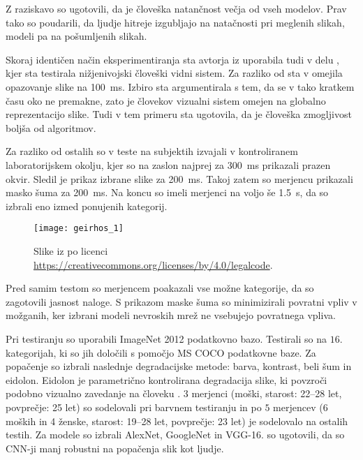 Z raziskavo so ugotovili, da je človeška natančnost večja od vseh modelov. Prav tako so poudarili, da ljudje hitreje izgubljajo na natačnosti pri meglenih slikah, modeli pa na pošumljenih slikah.

Skoraj identičen način eksperimentiranja sta avtorja iz \cite{dodge2017a} uporabila tudi v delu \cite{dodge2017can}, kjer sta testirala nižjenivojski človeški vidni sistem. Za razliko od \cite{dodge2017a} sta v \cite{dodge2017can} omejila opazovanje slike na \SI{100}{\ms}. Izbiro sta argumentirala s tem, da se v tako kratkem času oko ne premakne, zato je človekov vizualni sistem omejen na globalno reprezentacijo slike. Tudi v tem primeru sta ugotovila, da je človeška zmogljivost boljša od algoritmov.


Za razliko od ostalih so v \cite{geirhos2017comparing} teste na subjektih izvajali v kontroliranem laboratorijskem okolju, kjer so na zaslon najprej za \SI{300}{\ms} prikazali prazen okvir. Sledil je prikaz izbrane slike za \SI{200}{\ms}. Takoj zatem so merjencu prikazali masko šuma za \SI{200}{\ms}. Na koncu so imeli merjenci na voljo še \SI{1.5}{\s}, da so izbrali eno izmed ponujenih kategorij.

\begin{figure}[!htbp]
	\centering
	\texttt{[image: geirhos\_1]}
	\caption{Slike iz \cite{geirhos2017image} po licenci \url{https://creativecommons.org/licenses/by/4.0/legalcode}.}
\end{figure}

Pred samim testom so merjencem poakazali vse možne kategorije, da so zagotovili jasnost naloge. S prikazom maske šuma so minimizirali povratni vpliv v možganih, ker izbrani modeli nevroskih mrež ne vsebujejo povratnega vpliva.

Pri testiranju so \cite{geirhos2017comparing} uporabili ImageNet 2012 podatkovno bazo. Testirali so na $16$. kategorijah, ki so jih določili s pomočjo MS COCO podatkovne baze. Za popačenje so izbrali naslednje degradacijske metode: barva, kontrast, beli šum in eidolon. Eidolon je parametrično kontrolirana degradacija slike, ki povzroči podobno vizualno zavedanje na človeku \cite{geirhos2017comparing}. $3$ merjenci (moški, starost: 22--28 let, povprečje: 25 let) so sodelovali pri barvnem testiranju in po $5$ merjencev (6 moških in 4 ženske, starost: 19--28 let, povprečje: 23 let) je sodelovalo na ostalih testih. Za modele so izbrali AlexNet, GoogleNet in VGG-16.  so ugotovili, da so CNN-ji manj robustni na popačenja slik kot ljudje.


